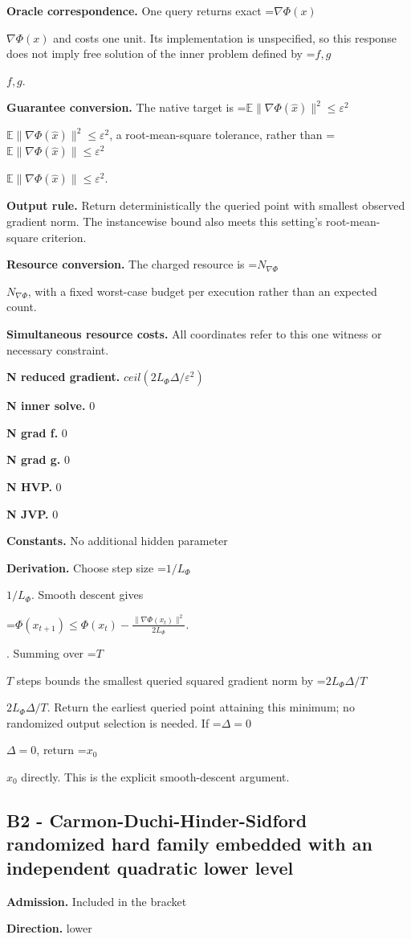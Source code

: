 \documentclass[10pt,a4paper]{article}
\newcommand{\AtlasMath}[1]{\par\begingroup\centering\setbox0=\hbox{$\displaystyle #1$}\ifdim\wd0>1.4\linewidth\typeout{ATLAS WIDE FORMULA: \the\wd0}\fi\ifdim\wd0>\linewidth\resizebox{\linewidth}{!}{\box0}\else\box0\fi\par\endgroup}
\newcommand{\AtlasInlineMath}[1]{\begingroup\setbox0=\hbox{$#1$}\ifdim\wd0>.4\linewidth\endgroup\AtlasMath{#1}\else\endgroup$#1$\fi}
\begin{document}
\textbf{Oracle correspondence.} One query returns exact \AtlasInlineMath{\nabla\Phi(x)} and costs one unit. Its implementation is unspecified, so this response does not imply free solution of the inner problem defined by \AtlasInlineMath{f,g}.

\textbf{Guarantee conversion.} The native target is \AtlasInlineMath{\mathbb E\|\nabla\Phi(\widehat x)\|^2\le\varepsilon^2}, a root-mean-square tolerance, rather than \AtlasInlineMath{\mathbb E\|\nabla\Phi(\widehat x)\|\le\varepsilon^2}.

\textbf{Output rule.} Return deterministically the queried point with smallest observed gradient norm. The instancewise bound also meets this setting's root-mean-square criterion.

\textbf{Resource conversion.} The charged resource is \AtlasInlineMath{N_{\nabla\Phi}}, with a fixed worst-case budget per execution rather than an expected count.

\textbf{Simultaneous resource costs.} All coordinates refer to this one witness or necessary constraint.

\textbf{N reduced gradient.} $ceil(2L_\Phi \Delta /\varepsilon ^2)$

\textbf{N inner solve.} 0

\textbf{N grad f.} 0

\textbf{N grad g.} 0

\textbf{N HVP.} 0

\textbf{N JVP.} 0

\textbf{Constants.} No additional hidden parameter

\textbf{Derivation.} Choose step size \AtlasInlineMath{1/L_\Phi}. Smooth descent gives 
\AtlasMath{\Phi(x_{t+1})\le\Phi(x_t)-\frac{\|\nabla\Phi(x_t)\|^2}{2L_\Phi}.}
. Summing over \AtlasInlineMath{T} steps bounds the smallest queried squared gradient norm by \AtlasInlineMath{2L_\Phi\Delta/T}. Return the earliest queried point attaining this minimum; no randomized output selection is needed. If \AtlasInlineMath{\Delta=0}, return \AtlasInlineMath{x_0} directly. This is the explicit smooth-descent argument.

\subsection{B2 - Carmon-Duchi-Hinder-Sidford randomized hard family embedded with an independent quadratic lower level}
\textbf{Admission.} Included in the bracket

\textbf{Direction.} lower
\end{document}
